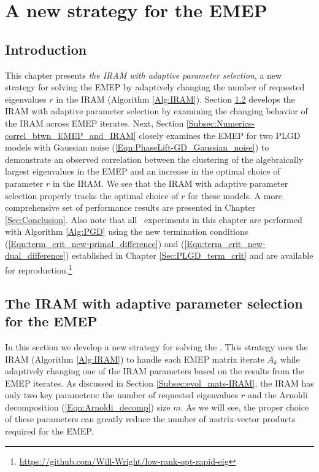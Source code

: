 \chapter{A new strategy for the EMEP}
\label{Sec:Numerics}



\section{Introduction}
\label{Subsec:Numerics-intro}


This chapter presents \textit{the IRAM with adaptive parameter selection}, a new strategy for solving the EMEP by adaptively changing
the number of requested eigenvalues $r$ in the IRAM (Algorithm \ref{Alg:IRAM}).
Section \ref{Subsec:Numerics-adaptive_IRAM} develops the IRAM with adaptive parameter selection by examining the changing behavior of the IRAM across EMEP iterates.
Next, Section \ref{Subsec:Numerics-correl_btwn_EMEP_and_IRAM} closely examines the EMEP for two PLGD models with Gaussian noise (\ref{Eqn:PhaseLift-GD_Gaussian_noise}) to demonstrate an observed correlation between the clustering of the algebraically largest eigenvalues in the EMEP and an increase in the optimal choice of parameter $r$ in the IRAM.
We see that the IRAM with adaptive parameter selection properly tracks the optimal choice of $r$ for these models.
A more comprehensive set of performance results are presented in  Chapter \ref{Sec:Conclusion}.
Also note that all \emep \ experiments in this chapter are performed with Algorithm \ref{Alg:PGD} using the new termination conditions (\ref{Eqn:term_crit_new-primal_difference}) and (\ref{Eqn:term_crit_new-dual_difference}) established in Chapter \ref{Sec:PLGD_term_crit} and are available for reproduction.\footnote{\url{https://github.com/Will-Wright/low-rank-opt-rapid-eig}}








\section{The IRAM with adaptive parameter selection for the EMEP}
\label{Subsec:Numerics-adaptive_IRAM}



In this section we develop a new strategy for solving the \emep.  
This strategy uses the IRAM (Algorithm \ref{Alg:IRAM}) to handle each EMEP matrix iterate $A_k$ while adaptively changing one of the IRAM parameters based on the results from the EMEP iterates.
As discussed in Section \ref{Subsec:evol_mats-IRAM}, the IRAM has only two key parameters: the number of requested eigenvalues $r$ and the Arnoldi decomposition (\ref{Eqn:Arnoldi_decomp}) size $m$.
As we will see, the proper choice of these parameters can greatly reduce the number of matrix-vector products required for the EMEP.


